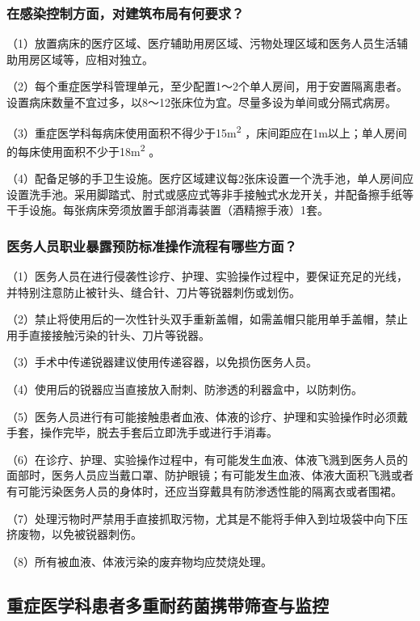 \subsubsection{在感染控制方面，对建筑布局有何要求？}

（1）放置病床的医疗区域、医疗辅助用房区域、污物处理区域和医务人员生活辅助用房区域等，应相对独立。

（2）每个重症医学科管理单元，至少配置1～2个单人房间，用于安置隔离患者。设置病床数量不宜过多，以8～12张床位为宜。尽量多设为单间或分隔式病房。

（3）重症医学科每病床使用面积不得少于15m\textsuperscript{2}
，床间距应在1m以上；单人房间的每床使用面积不少于18m\textsuperscript{2}
。

（4）配备足够的手卫生设施。医疗区域建议每2张床设置一个洗手池，单人房间应设置洗手池。采用脚踏式、肘式或感应式等非手接触式水龙开关，并配备擦手纸等干手设施。每张病床旁须放置手部消毒装置（酒精擦手液）1套。

\subsubsection{医务人员职业暴露预防标准操作流程有哪些方面？}

（1）医务人员在进行侵袭性诊疗、护理、实验操作过程中，要保证充足的光线，并特别注意防止被针头、缝合针、刀片等锐器刺伤或划伤。

（2）禁止将使用后的一次性针头双手重新盖帽，如需盖帽只能用单手盖帽，禁止用手直接接触污染的针头、刀片等锐器。

（3）手术中传递锐器建议使用传递容器，以免损伤医务人员。

（4）使用后的锐器应当直接放入耐刺、防渗透的利器盒中，以防刺伤。

（5）医务人员进行有可能接触患者血液、体液的诊疗、护理和实验操作时必须戴手套，操作完毕，脱去手套后立即洗手或进行手消毒。

（6）在诊疗、护理、实验操作过程中，有可能发生血液、体液飞溅到医务人员的面部时，医务人员应当戴口罩、防护眼镜；有可能发生血液、体液大面积飞溅或者有可能污染医务人员的身体时，还应当穿戴具有防渗透性能的隔离衣或者围裙。

（7）处理污物时严禁用手直接抓取污物，尤其是不能将手伸入到垃圾袋中向下压挤废物，以免被锐器刺伤。

（8）所有被血液、体液污染的废弃物均应焚烧处理。

\subsection{重症医学科患者多重耐药菌携带筛查与监控}

